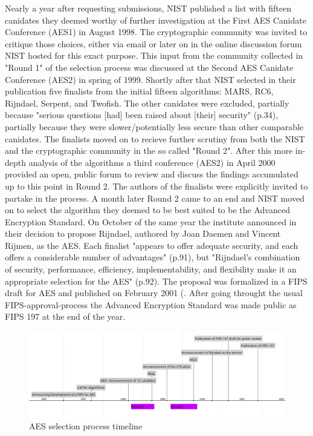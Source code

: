 Nearly a year after requesting submissions, NIST published a list with fifteen canidates they deemed worthy of further investigation at the First AES Canidate Conference (AES1) in August 1998. The cryptographic community was invited to critique those choices, either via email or later on in the online discussion forum NIST hosted for this exact purpose. This input from the community collected in "Round 1" of the selection process was discussed at the Second AES Canidate Conference (AES2) in spring of 1999. Shortly after that NIST selected in their publication \cite{round1report} five finalists from the initial fifteen algorithms: MARS, RC6, Rijndael, Serpent, and Twofish.
The other canidates were excluded, partially because "serious questions [had] been raised about [their] security" (p.34), partially because they were slower/potentially less secure than other comparable canidates.
The finalists moved on to recieve further scrutiny from both the NIST and the cryptographic community in the so called "Round 2".
After this more in-depth analysis of the algorithms a third conference (AES2) in April 2000 provided an open, public forum to review and discuss the findings accumulated up to this point in Round 2. The authors of the finalists were explicitly invited to partake in the process. A month later Round 2 came to an end and NIST moved on to select the algorithm they deemed to be best suited to be the Advanced Encryption Standard. 
On October of the same year the institute announced in \cite{round2report} their decision to propose Rijndael, authored by Joan Daemen and Vincent Rijmen, as the AES. Each finalist "appears  to  offer adequate security, and each offers a considerable number of advantages" (p.91), but "Rijndael’s combination of security, performance, efficiency, implementability, and flexibility make it an appropriate selection for the AES" (p.92).
The proposal was formalized in a FIPS draft for AES and published on February 2001 (\cite{fipsdraft}. After going throught the usual FIPS-approval-process the Advanced Encryption Standard was made public as FIPS 197 \cite{fips197} at the end of the year.

\begin{figure}
\centering
\includegraphics[scale=0.35]{aes-process-timeline.png}
\caption{AES selection process timeline}
\end{figure}

